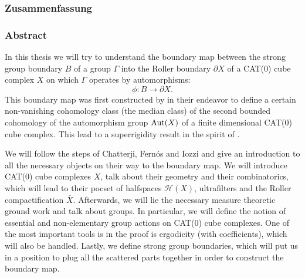
\subsubsection*{Zusammenfassung}
%
\label{sec:Zusammenfassung}

\subsubsection*{Abstract}
\label{sec:abstract}

In this thesis we will try to understand the boundary map between the strong group boundary \(B\) of a group \(\Gamma\) into the Roller boundary \(\partial X\) of a CAT(0) cube complex \(X\) on which \(\Gamma\) operates by automorphisms:
\[
  \phi\colon B \to \partial X.
\]
This boundary map was first constructed by \textcite{MR3509968} in their endeavor to define a certain non-vanishing cohomology class (the median class) of the second bounded cohomology of the automorphism group \(\operatorname{Aut}(X)\) of a finite dimensional CAT(0) cube complex. This lead to a superrigidity result in the spirit of \textcite{MR1090825}.

We will follow the steps of Chatterji, Fernós and Iozzi and give an introduction to all the necessary objects on their way to the boundary map. We will introduce CAT(0) cube complexes \(X\), talk about their geometry and their combinatorics, which will lead to their pocset of halfspaces \(\mathcal{H}(X)\), ultrafilters and the Roller compactification \(\bar X\). Afterwards, we will lie the necessary measure theoretic ground work and talk about groups. In particular, we will define the notion of essential and non-elementary group actions on CAT(0) cube complexes. One of the most important tools is in the proof is ergodicity (with coefficients), which will also be handled. Lastly, we define strong group boundaries, which will put us in a position to plug all the scattered parts together in order to construct the boundary map.

